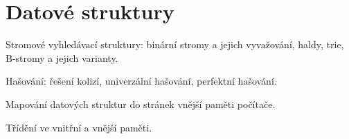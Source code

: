 \newpage
\section{Datové struktury}
\begin{pozadavky}
\begin{pitemize}
\item Stromové vyhledávací struktury: binární stromy a jejich vyvažování, haldy, trie, B-stromy a jejich varianty.
\item Hašování: řešení kolizí, univerzální hašování, perfektní hašování. 
\item Mapování datových struktur do stránek vnější paměti počítače.
\item Třídění ve vnitřní a vnější paměti.
\end{pitemize}
\end{pozadavky}



